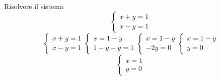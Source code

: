 \begin{exercise}{}
	Risolvere il sistema 
	\[
	\begin{cases}
		x+y=1\\
		x-y=1
	\end{cases}
	\]
	\tcblower
	\[
	\begin{cases}
		x+y=1\\
		x-y=1
	\end{cases}
	\begin{cases}
		x=1-y\\
		1-y-y=1
	\end{cases}
	\begin{cases}
		x=1-y\\
		-2y=0
	\end{cases}
	\begin{cases}
	x=1-y\\
	y=0
	\end{cases}
	\]
	\[
	\begin{cases}
		x=1\\
		y=0
	\end{cases}
	\]
\end{exercise}
